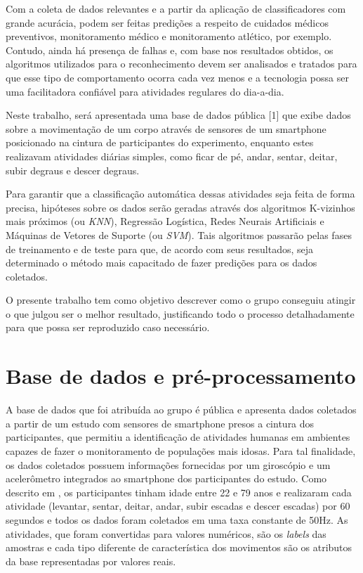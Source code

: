 \documentclass[10pt, conference, compsocconf]{IEEEtran}
\begin{document}
Com a coleta de dados relevantes e a partir da aplicação de classificadores com
grande acurácia, podem ser feitas predições a respeito de cuidados médicos
preventivos, monitoramento médico e monitoramento atlético, por exemplo. Contudo, 
ainda há presença de falhas e, com base nos resultados obtidos, os algoritmos
utilizados para o reconhecimento devem ser analisados e tratados para que esse
tipo de comportamento ocorra cada vez menos e a tecnologia possa ser uma 
facilitadora confiável para atividades regulares do dia-a-dia.

Neste trabalho, será apresentada uma base de dados pública [1] que exibe dados 
sobre a movimentação de um corpo através de sensores de um smartphone posicionado 
na cintura de participantes do experimento, enquanto estes realizavam atividades 
diárias simples, como ficar de pé, andar, sentar, deitar, subir degraus e 
descer degraus. 

Para garantir que a classificação automática dessas atividades seja feita de
forma precisa, hipóteses sobre os dados serão geradas através dos algoritmos
K-vizinhos mais próximos (ou \textit{KNN}), Regressão Logística, Redes Neurais 
Artificiais e Máquinas de Vetores de Suporte (ou \textit{SVM}). Tais algoritmos 
passarão pelas fases de treinamento e de teste para que, de acordo com seus
resultados, seja determinado o método mais capacitado de fazer predições para 
os dados coletados.


O presente trabalho tem como objetivo descrever como o grupo conseguiu atingir o
que julgou ser o melhor resultado, justificando todo o processo detalhadamente
para que possa ser reproduzido caso necessário. 


\section{Base de dados e pré-processamento}\label{sec:base_dados}
A base de dados que foi atribuída ao grupo é pública e apresenta dados coletados 
a partir de um estudo com sensores de smartphone presos a cintura dos
participantes, que permitiu a identificação de atividades humanas em ambientes 
capazes de fazer o monitoramento de populações mais idosas. 
Para tal finalidade, os dados coletados possuem informações fornecidas por um 
giroscópio e um acelerômetro integrados ao smartphone dos participantes do estudo. 
Como descrito em \cite{uci_dataset}, os participantes tinham idade entre 22 e 79 anos e 
realizaram cada atividade (levantar, sentar, deitar, andar, subir escadas e 
descer escadas) por 60 segundos e todos os dados foram coletados em uma taxa 
constante de 50Hz. As atividades, que foram convertidas para valores numéricos, 
são os \textit{labels} das amostras e cada tipo diferente de característica 
dos movimentos são os atributos da base representadas por valores reais.\newline
\end{document}
